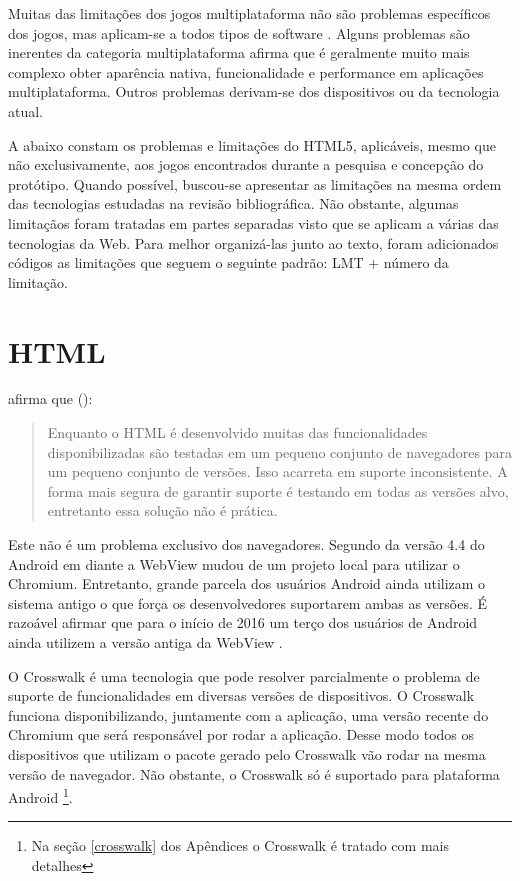 
Muitas das limitações dos jogos multiplataforma não são
problemas específicos dos jogos, mas aplicam-se a todos tipos
de software \autocite[p. 3]{currentStateCrossPlatform}. Alguns
problemas são inerentes da categoria multiplataforma \citet[p.
7 ]{viabilityBusinessApplications} afirma que é geralmente muito
mais complexo obter aparência nativa, funcionalidade e performance
em aplicações multiplataforma. Outros problemas derivam-se dos
dispositivos ou da tecnologia atual.

A abaixo constam os problemas e limitações do HTML5, aplicáveis,
mesmo que não exclusivamente, aos jogos encontrados durante a pesquisa
e concepção do protótipo. Quando possível, buscou-se apresentar
as limitações na mesma ordem das tecnologias estudadas na revisão
bibliográfica. Não obstante, algumas limitaçãos foram tratadas em
partes separadas visto que se aplicam a várias das tecnologias da
Web. Para melhor organizá-las junto ao texto, foram adicionados
códigos as limitações que seguem o seguinte padrão: LMT + número da
limitação.

\section{HTML}

\noindent\citet{crossPlatformMobileGame} afirma que ():
\begin{quote}
Enquanto o HTML é desenvolvido muitas das funcionalidades
disponibilizadas são testadas em um pequeno conjunto de navegadores
para um pequeno conjunto de versões. Isso acarreta em suporte
inconsistente. A forma mais segura de garantir suporte é testando em
todas as versões alvo, entretanto essa solução não é prática.
\end{quote}

Este não é um problema exclusivo dos navegadores. Segundo
\citet{chromeWebView} da versão 4.4 do Android em diante a WebView
mudou de um projeto local para utilizar o Chromium. Entretanto, grande
parcela dos usuários Android ainda utilizam o sistema antigo o que
força os desenvolvedores suportarem ambas as versões. É razoável
afirmar que para o início de 2016 um terço dos usuários de Android
ainda utilizem a versão antiga da WebView \autocite{chromeWebView}.

O Crosswalk é uma tecnologia que pode resolver parcialmente o problema
de suporte de funcionalidades em diversas versões de dispositivos.
O Crosswalk funciona disponibilizando, juntamente com a aplicação,
uma versão recente do Chromium que será responsável por rodar a
aplicação. Desse modo todos os dispositivos que utilizam o pacote
gerado pelo Crosswalk vão rodar na mesma versão de navegador. Não
obstante, o Crosswalk só é suportado para plataforma Android \footnote{Na
seção \ref{crosswalk} dos Apêndices o Crosswalk é tratado com mais
detalhes}.

